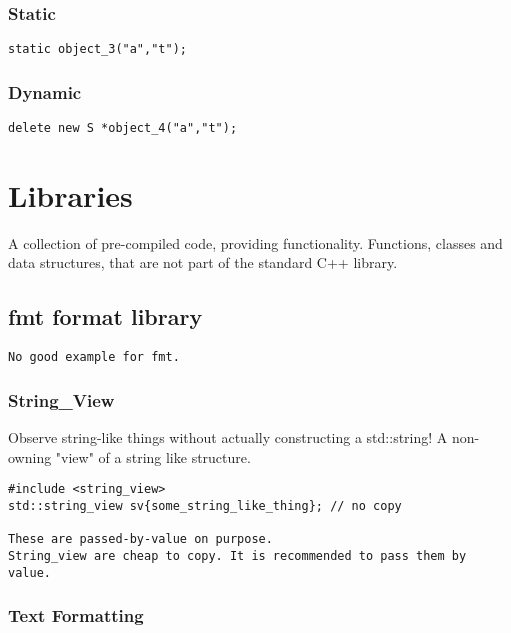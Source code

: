 \subsection{Static}
\begin{verbatim}
static object_3("a","t");
\end{verbatim}

\subsection{Dynamic}

\begin{verbatim}
delete new S *object_4("a","t");
\end{verbatim}

\chapter{Libraries}

A collection of pre-compiled code, providing functionality. Functions, classes and data structures,
that are not part of the standard C++ library.

\section{fmt format library}

\begin{verbatim}
No good example for fmt.
\end{verbatim}
\subsection{String\_View}

Observe string-like things without actually constructing a std::string!
A non-owning "view" of a string like structure.

\begin{verbatim}
#include <string_view>
std::string_view sv{some_string_like_thing}; // no copy

These are passed-by-value on purpose.
String_view are cheap to copy. It is recommended to pass them by value.
\end{verbatim}

\subsection{Text Formatting}

